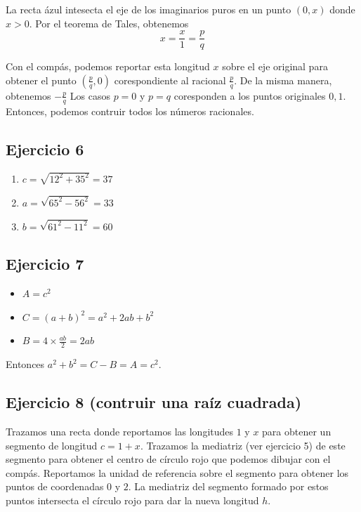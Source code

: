 La recta ázul intesecta el eje de los imaginarios puros en un punto
$(0,x)$ donde $x > 0$. Por el teorema de Tales, obtenemos
$$
x = \frac{x}{1} = \frac{p}{q}
$$

Con el compás, podemos reportar esta longitud $x$ sobre el eje original para
obtener el punto $\left(\frac{p}{q}, 0 \right)$ corespondiente al racional
$\frac{p}{q}$. De la misma manera, obtenemos $-\frac{p}{q}$
Los casos $p = 0$ y $p = q$ coresponden a los puntos originales $0, 1$.
Entonces, podemos contruir todos los números racionales.

\subsection{Ejercicio 6}

\begin{enumerate}
\item $c = \sqrt{12^2 + 35^2} = 37$
\item $a = \sqrt{65^2 - 56^2} = 33$
\item $b = \sqrt{61^2 - 11^2} = 60$
\end{enumerate}

\subsection{Ejercicio 7}

\begin{itemize}
  \item $A = c^2$
  \item $C = \left(a+b\right)^2 = a^2 + {2ab} + b^2$
  \item $B = 4 \times \frac{ab}{2} = {2ab}$
\end{itemize}

Entonces $a^2 + b^2 = C - B = A = c^2$.

\subsection{Ejercicio 8 (contruir una raíz cuadrada)}

Trazamos una recta donde reportamos las longitudes $1$ y $x$ para obtener
un segmento de longitud $c = 1 + x$. Trazamos la mediatriz (ver ejercicio 5)
de este segmento para obtener el centro de círculo rojo que podemos dibujar con
el compás. Reportamos la unidad de referencia sobre el segmento para obtener
los puntos de coordenadas $0$ y $2$. La mediatriz del segmento formado por estos
puntos intersecta el círculo rojo para dar la nueva longitud $h$.

